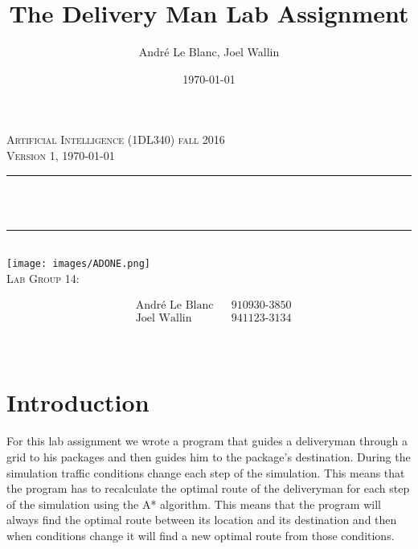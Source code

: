 \documentclass[12pt, a4paper]{article}
\title{The Delivery Man Lab Assignment}	%
\author{André Le Blanc, Joel Wallin}
\date{\today}
\makeatletter
\let\thetitle\@title
\makeatother
\begin{document}
\begin{titlepage}
	\centering
    \vspace*{0.5 cm}
    \textsc{\huge Artificial Intelligence (1DL340) fall 2016}\\[2.0 cm]
	\textsc{\Large Version 1, \today}\\[0.5 cm]
	\rule{\linewidth}{0.2 mm} \\[0.4 cm]
	{ \huge \bfseries \thetitle}\\
   
	\rule{\linewidth}{0.2 mm} \\[1.5 cm]
    
    \texttt{[image: images/ADONE.png]}\\[0.5 cm]
    
    \textsc{\Large Lab Group 14:}\\[0.5 cm]
	\begin{minipage}{0.4\textwidth}  
    \begin{align*}
	&\text{André Le Blanc}    &&\text{910930-3850}\\
	&\text{Joel Wallin}  &&\text{941123-3134}\\
	\end{align*}
	\end{minipage}\\[2 cm]
\end{titlepage}


\newpage
\tableofcontents
\newpage

\section{Introduction}

For this lab assignment we wrote a program that guides a deliveryman through a grid to his packages and then guides him to the package's destination. During the simulation traffic conditions change each step of the simulation. This means that the program has to recalculate the optimal route of the deliveryman for each step of the simulation using the A* algorithm. This means that the program will always find the optimal route between its location and its destination and then when conditions change it will find a new optimal route from those conditions.
\end{document}
